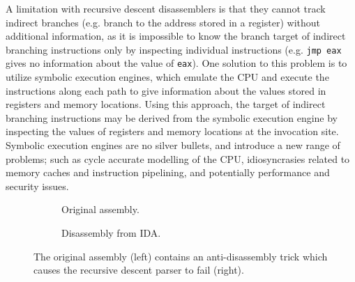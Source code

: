 A limitation with recursive descent disassemblers is that they cannot track indirect branches (e.g. branch to the address stored in a register) without additional information, as it is impossible to know the branch target of indirect branching instructions only by inspecting individual instructions (e.g. \texttt{jmp eax} gives no information about the value of \texttt{eax}). One solution to this problem is to utilize symbolic execution engines, which emulate the CPU and execute the instructions along each path to give information about the values stored in registers and memory locations. Using this approach, the target of indirect branching instructions may be derived from the symbolic execution engine by inspecting the values of registers and memory locations at the invocation site. Symbolic execution engines are no silver bullets, and introduce a new range of problems; such as cycle accurate modelling of the CPU, idiosyncrasies related to memory caches and instruction pipelining, and potentially performance and security issues.




\begin{figure}[htbp]
	\centering
	\begin{subfigure}[t]{0.59\textwidth}
		
		\caption{Original assembly.}
	\end{subfigure}
	\qquad
	\begin{subfigure}[t]{0.34\textwidth}
		
		\caption{Disassembly from IDA.}
	\end{subfigure}
	\caption{The original assembly (left) contains an anti-disassembly trick which causes the recursive descent parser to fail (right).}
	\label{fig:anti-disassembly}
\end{figure}


